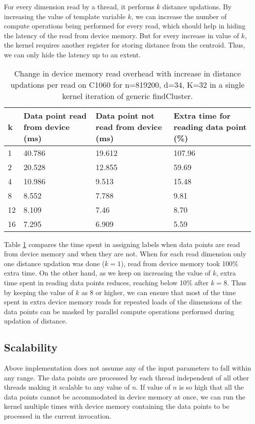 For every dimension read by a thread, it performs $k$ distance updations. By increasing the value of template variable $k$, we can increase the number of compute operations being performed for every read, which should help in hiding the latency of the read from device memory. But for every increase in value of $k$, the kernel requires another register for storing distance from the centroid. Thus, we can only hide the latency up to an extent.
\begin{table}[htbp]
\begin{center}
\begin{tabular}{|p{0.5cm}|p{3cm}|p{3cm}|p{3cm}|}
\hline
\multicolumn{1}{|l|}{k} & \multicolumn{1}{p{2.9cm}|}{Data point read from device (ms)} & \multicolumn{1}{p{3cm}|}{Data point not read from device (ms)} & \multicolumn{1}{p{3.5cm}|}{Extra time for reading data point (\%)} \\ \hline
1 & 40.786 & 19.612 & 107.96 \\ \hline
2 & 20.528 & 12.855 & 59.69 \\ \hline
4 & 10.986 & 9.513 & 15.48 \\ \hline
8 & 8.552 & 7.788 & 9.81 \\ \hline
12 & 8.109 & 7.46 & 8.70 \\ \hline
16 & 7.295 & 6.909 & 5.59 \\ \hline
\end{tabular}
\end{center}
\caption{Change in device memory read overhead with increase in distance updations per read on C1060 for n=819200, d=34, K=32 in a single kernel iteration of generic findCluster.}
\label{table:highC1060latency}
\end{table}

Table \ref{table:highC1060latency} compares the time spent in assigning labels when data points are read from device memory and when they are not. When for each read dimension only one distance updation was done ($k = 1$), read from device memory took 100\% extra time. On the other hand, as we keep on increasing the value of $k$, extra time spent in reading data points reduces, reaching below 10\% after $k = 8$. 
Thus by keeping the value of $k$ as 8 or higher, we can ensure that most of the time spent in extra device memory reads for repeated loads of the dimensions of the data points can be masked by parallel compute operations performed during updation of distance.
\subsection{Scalability}
Above implementation does not assume any of the input parameters to fall within any range. The data points are processed by each thread independent of all other threads making it scalable to any value of $n$. If value of $n$ is so high that all the data points cannot be accommodated in device memory at once, we can run the kernel multiple times with device memory containing the data points to be processed in the current invocation.

